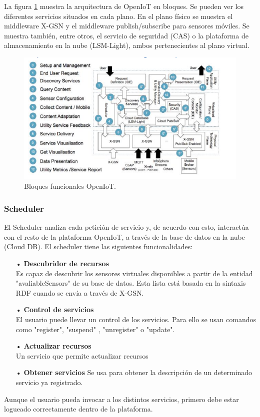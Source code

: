\documentclass[12pt, twoside]{book}
\begin{document}
La figura \ref{L302} muestra la arquitectura de OpenIoT en bloques. Se pueden ver los diferentes servicios situados en cada plano. En el plano físico se muestra el middleware X-GSN y el middleware publish/subscribe para sensores móviles. Se muestra también, entre otros, el servicio de seguridad (CAS) o la plataforma de almacenamiento en la nube (LSM-Light), ambos pertenecientes al plano virtual. 

\begin{figure}[H]
\centering
\includegraphics[scale=0.7]{images/blocks_openiot}
\caption{Bloques funcionales OpenIoT.}\label{L302}
\end{figure}

\subsubsection{Scheduler}
El Scheduler analiza cada petición de servicio y, de acuerdo con esto, interactúa con el resto de la plataforma OpenIoT, a través de la base de datos en la nube (Cloud DB). El scheduler tiene las siguientes funcionalidades:
\begin{itemize}
\item[•] \textbf{Descubridor de recursos}\\
Es capaz de descubrir los sensores virtuales disponibles a partir de la entidad "avaliableSensors" de su base de datos. Esta lista está basada en la sintaxis RDF cuando se envía a través de X-GSN.
\item[•] \textbf{Control de servicios}\\
El usuario puede llevar un control de los servicios. Para ello se usan comandos como "register", "suspend" , "unregister" o "update".
\item[•] \textbf{Actualizar recursos}\\
Un servicio que permite actualizar recursos
\item[•] \textbf{Obtener servicios}
Se usa para obtener la descripción de un determinado servicio ya registrado. 
\end{itemize}
Aunque el usuario pueda invocar a los distintos servicios, primero debe estar logueado correctamente dentro de la plataforma.
\end{document}
